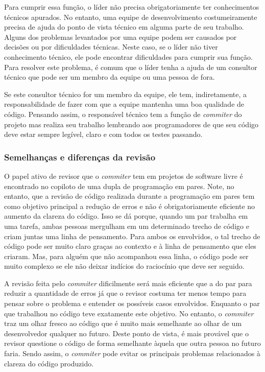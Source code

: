 Para cumprir essa função, o líder não precisa obrigatoriamente ter
conhecimentos técnicos apurados. No entanto, uma equipe de
desenvolvimento costumeiramente precisa de ajuda do ponto de vista
técnico em alguma parte de seu trabalho. Alguns dos problemas
levantados por uma equipe podem ser causados por decisões ou por
dificuldades técnicas. Neste caso, se o líder não tiver conhecimento
técnico, ele pode encontrar dificuldades para cumprir sua função. Para
resolver este problema, é comum que o líder tenha a ajuda de um
consultor técnico que pode ser um membro da equipe ou uma pessoa de
fora.

Se este consultor técnico for um membro da equipe, ele tem,
indiretamente, a responsabilidade de fazer com que a equipe mantenha
uma boa qualidade de código. Pensando assim, o responsável técnico tem
a função de \emph{commiter} do projeto mas realiza seu trabalho
lembrando aos programadores de que seu código deve estar sempre
legível, claro e com todos os testes passando.

\subsubsection{Semelhanças e diferenças da revisão}

O papel ativo de revisor que o \emph{commiter} tem em projetos de
software livre é encontrado no copiloto de uma dupla de programação em
pares. Note, no entanto, que a revisão de código realizada durante a
programação em pares tem como objetivo principal a redução de erros e
não é obrigatoriamente eficiente no aumento da clareza do código. Isso
se dá porque, quando um par trabalha em uma tarefa, ambas pessoas
mergulham em um determinado trecho de código e criam juntas uma linha
de pensamento. Para ambos os envolvidos, o tal trecho de código pode
ser muito claro graças ao contexto e à linha de pensamento que eles
criaram. Mas, para alguém que não acompanhou essa linha, o código pode
ser muito complexo se ele não deixar indícios do raciocínio que deve
ser seguido.

A revisão feita pelo \emph{commiter} dificilmente será mais eficiente
que a do par para reduzir a quantidade de erros já que o revisor
costuma ter menos tempo para pensar sobre o problema e entender os
possíveis casos envolvidos. Enquanto o par que trabalhou no código
teve exatamente este objetivo. No entanto, o \emph{commiter} traz um
olhar fresco ao código que é muito mais semelhante ao olhar de um
desenvolvedor qualquer no futuro. Deste ponto de vista, é mais
provável que o revisor questione o código de forma semelhante àquela
que outra pessoa no futuro faria. Sendo assim, o \emph{commiter} pode
evitar os principais problemas relacionados à clareza do código
produzido.

